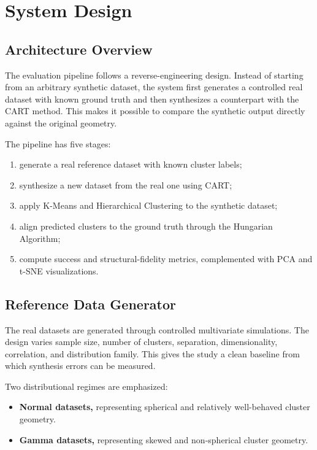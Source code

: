 \chapter{System Design}
\label{chap:system-design}

\section{Architecture Overview}
\label{sec:architecture-overview}

The evaluation pipeline follows a reverse-engineering design. Instead of starting from an arbitrary synthetic dataset, the system first generates a controlled real dataset with known ground truth and then synthesizes a counterpart with the CART method. This makes it possible to compare the synthetic output directly against the original geometry.

The pipeline has five stages:
\begin{enumerate}
  \item generate a real reference dataset with known cluster labels;
  \item synthesize a new dataset from the real one using CART;
  \item apply K-Means and Hierarchical Clustering to the synthetic dataset;
  \item align predicted clusters to the ground truth through the Hungarian Algorithm;
  \item compute success and structural-fidelity metrics, complemented with PCA and t-SNE visualizations.
\end{enumerate}

\section{Reference Data Generator}
\label{sec:reference-data-generator}

The real datasets are generated through controlled multivariate simulations. The design varies sample size, number of clusters, separation, dimensionality, correlation, and distribution family. This gives the study a clean baseline from which synthesis errors can be measured.

Two distributional regimes are emphasized:
\begin{itemize}
  \item \textbf{Normal datasets,} representing spherical and relatively well-behaved cluster geometry.
  \item \textbf{Gamma datasets,} representing skewed and non-spherical cluster geometry.
\end{itemize}


